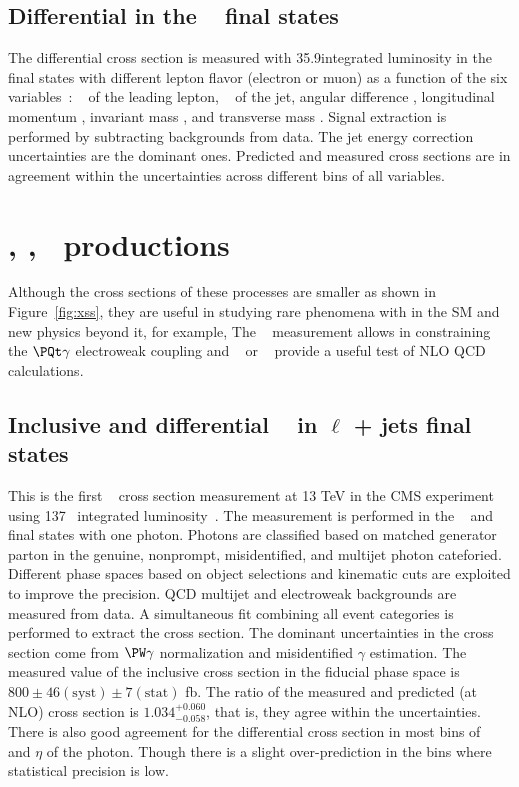 \subsection{Differential in the \dilep~ final states}
The differential cross section is measured with 35.9\fbinv integrated luminosity in the \dilep~ final
states with different lepton flavor (electron or muon) as a function of the six 
variables~\cite{CMS-PAS-TOP-19-003}: \pt~ of the leading lepton, \pt~ of the jet, angular difference
\deltaPhiVar, longitudinal momentum \pzvar, invariant mass \invmassvar, and transverse mass 
\transmassvar. Signal extraction is performed by subtracting backgrounds from data. The jet energy 
correction uncertainties are the dominant ones. Predicted and measured cross sections are in 
agreement within the uncertainties across different bins of all variables.

\section{\ttgamma, \ttcc, \ttbb~productions}
\label{sec:ttX}
Although the cross sections of these processes are smaller as shown in Figure~\ref{fig:xss},
they are useful in studying rare phenomena with in the SM and new physics beyond it, for example,
The \ttgamma~ measurement allows in constraining the $\PQt\gamma$ electroweak coupling and \ttcc~ or
\ttbb~ provide a useful test of NLO QCD calculations. 

\subsection{Inclusive and differential \ttgamma~ in $\ell$ + jets final states}
This is the first \ttgamma~ cross section measurement at 13 TeV in the CMS experiment using 137\fbinv~
integrated luminosity~\cite{CMS-PAS-TOP-18-010}. The measurement is performed in the \ejets~ and 
\mujets~ final states with one photon. Photons are classified based on matched generator parton in 
the genuine, nonprompt, misidentified, and multijet photon cateforied. Different phase spaces based 
on object selections and kinematic cuts are exploited to improve the precision. QCD multijet and 
electroweak backgrounds are measured from data. A simultaneous fit combining all event categories is 
performed to extract the cross section. The dominant uncertainties in the cross section come from 
$\PW\gamma$ normalization and misidentified $\gamma$ estimation. The measured value of the inclusive
cross section in  the fiducial phase space is $800 \pm 46 (\text{syst}) \pm 7 (\text{stat})$ fb.
The ratio of the measured and predicted (at NLO) cross section is $1.034^{+0.060}_{-0.058}$,
that is, they agree within the uncertainties. There is also good agreement for the differential 
cross section in most bins of \pt~ and $\eta$ of the photon. Though there is a slight over-prediction
in the bins where statistical precision is low. 

